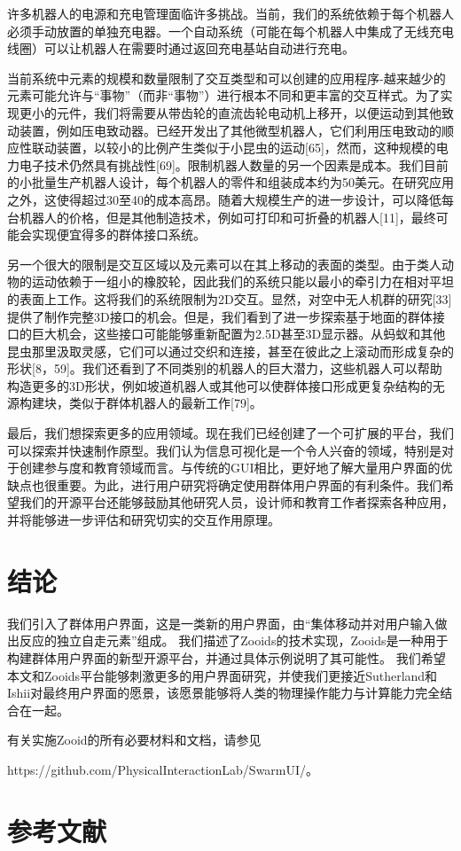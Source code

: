 许多机器人的电源和充电管理面临许多挑战。当前，我们的系统依赖于每个机器人必须手动放置的单独充电器。一个自动系统（可能在每个机器人中集成了无线充电线圈）可以让机器人在需要时通过返回充电基站自动进行充电。

当前系统中元素的规模和数量限制了交互类型和可以创建的应用程序-越来越少的元素可能允许与“事物”（而非“事物”）进行根本不同和更丰富的交互样式。为了实现更小的元件，我们将需要从带齿轮的直流齿轮电动机上移开，以便运动到其他致动装置，例如压电致动器。已经开发出了其他微型机器人，它们利用压电致动的顺应性联动装置，以较小的比例产生类似于小昆虫的运动[65]，然而，这种规模的电力电子技术仍然具有挑战性[69]。限制机器人数量的另一个因素是成本。我们目前的小批量生产机器人设计，每个机器人的零件和组装成本约为50美元。在研究应用之外，这使得超过30至40的成本高昂。随着大规模生产的进一步设计，可以降低每台机器人的价格，但是其他制造技术，例如可打印和可折叠的机器人[11]，最终可能会实现便宜得多的群体接口系统。

另一个很大的限制是交互区域以及元素可以在其上移动的表面的类型。由于类人动物的运动依赖于一组小的橡胶轮，因此我们的系统只能以最小的牵引力在相对平坦的表面上工作。这将我们的系统限制为2D交互。显然，对空中无人机群的研究[33]提供了制作完整3D接口的机会。但是，我们看到了进一步探索基于地面的群体接口的巨大机会，这些接口可能能够重新配置为2.5D甚至3D显示器。从蚂蚁和其他昆虫那里汲取灵感，它们可以通过交织和连接，甚至在彼此之上滚动而形成复杂的形状[8，59]。我们还看到了不同类别的机器人的巨大潜力，这些机器人可以帮助构造更多的3D形状，例如坡道机器人或其他可以使群体接口形成更复杂结构的无源构建块，类似于群体机器人的最新工作[79]。

最后，我们想探索更多的应用领域。现在我们已经创建了一个可扩展的平台，我们可以探索并快速制作原型。我们认为信息可视化是一个令人兴奋的领域，特别是对于创建参与度和教育领域而言。与传统的GUI相比，更好地了解大量用户界面的优缺点也很重要。为此，进行用户研究将确定使用群体用户界面的有利条件。我们希望我们的开源平台还能够鼓励其他研究人员，设计师和教育工作者探索各种应用，并将能够进一步评估和研究切实的交互作用原理。

\section{结论}

我们引入了群体用户界面，这是一类新的用户界面，由“集体移动并对用户输入做出反应的独立自走元素”组成。 我们描述了Zooids的技术实现，Zooids是一种用于构建群体用户界面的新型开源平台，并通过具体示例说明了其可能性。 我们希望本文和Zooids平台能够刺激更多的用户界面研究，并使我们更接近Sutherland和Ishii对最终用户界面的愿景，该愿景能够将人类的物理操作能力与计算能力完全结合在一起。

有关实施Zooid的所有必要材料和文档，请参见

https://github.com/PhysicalInteractionLab/SwarmUI/。

\section{参考文献}

